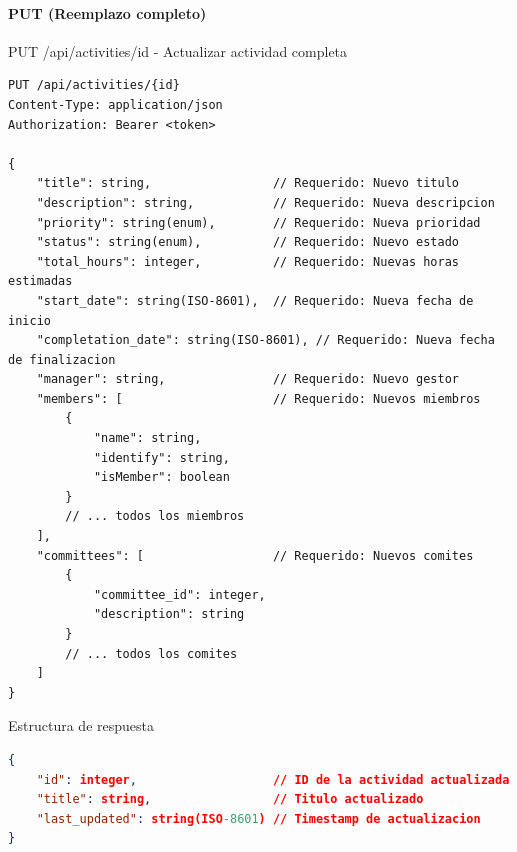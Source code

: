 \documentclass[11pt,a4paper]{article}
\begin{document}
\paragraph{PUT (Reemplazo completo)}
\begin{center}
	\begin{minipage}{\textwidth}
		\begin{codebox}{PUT /api/activities/{id} - Actualizar actividad completa}
			\begin{lstlisting}[language=HTTP]
PUT /api/activities/{id}
Content-Type: application/json
Authorization: Bearer <token>

{
    "title": string,                 // Requerido: Nuevo titulo
    "description": string,           // Requerido: Nueva descripcion
    "priority": string(enum),        // Requerido: Nueva prioridad
    "status": string(enum),          // Requerido: Nuevo estado
    "total_hours": integer,          // Requerido: Nuevas horas estimadas
    "start_date": string(ISO-8601),  // Requerido: Nueva fecha de inicio
    "completation_date": string(ISO-8601), // Requerido: Nueva fecha de finalizacion
    "manager": string,               // Requerido: Nuevo gestor
    "members": [                     // Requerido: Nuevos miembros
        {
            "name": string,
            "identify": string,
            "isMember": boolean
        }
        // ... todos los miembros
    ],
    "committees": [                  // Requerido: Nuevos comites
        {
            "committee_id": integer,
            "description": string
        }
        // ... todos los comites
    ]
}
\end{lstlisting}
		\end{codebox}
	\end{minipage}
\end{center}

\begin{center}
	\begin{minipage}{\textwidth}
		\begin{codebox}{Estructura de respuesta}
			\begin{lstlisting}[language=json]
{
    "id": integer,                   // ID de la actividad actualizada
    "title": string,                 // Titulo actualizado
    "last_updated": string(ISO-8601) // Timestamp de actualizacion
}
\end{lstlisting}
		\end{codebox}
	\end{minipage}
\end{center}
\end{document}
